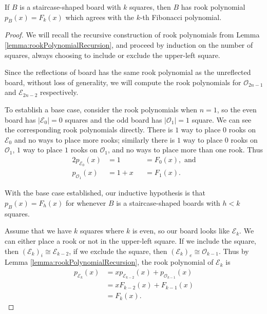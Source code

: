 \begin{lemma}
  If $B$ is a staircase-shaped board with $k$ squares, then
  $B$ has rook polynomial $p_{B}(x) = F_{k}(x)$ which agrees with the $k$-th
  Fibonacci polynomial.
\end{lemma}
\begin{proof}
  We will recall the recursive construction of rook polynomials from
  Lemma \ref{lemma:rookPolynomialRecursion}, and proceed by
  induction on the number of squares, always choosing to include or exclude
  the upper-left square.

  Since the reflections of board has the same rook polynomial as the
  unreflected board, without loss of generality, we
  will compute the rook polynomials for
  $\mathcal{O}_{2n-1}$ and $\mathcal{E}_{2n-2}$ respectively.


  To establish a base case, consider the rook polynomials when $n = 1$, so
  the even board has $|\mathcal{E}_{0}| = 0$ squares and
  the odd board has $|\mathcal{O}_{1}| = 1$ square.
  We can see the corresponding rook polynomials directly. There is $1$ way to
  place $0$ rooks on $\mathcal{E}_{0}$ and no ways to place more rooks;
  similarly there is
  $1$ way to place $0$ rooks on $\mathcal{O}_{1}$,
  $1$ way to place $1$ rooks on $\mathcal{O}_{1}$, and
  no ways to place more than one rook. Thus \begin{alignat}{2}
    p_{\mathcal{E}_{0}}(x) &= 1     &&= F_0(x), \text{ and} \\
    p_{\mathcal{O}_{1}}(x) &= 1 + x &&= F_1(x).
  \end{alignat}

  With the base case established, our inductive hypothesis is that
  $p_{B}(x) = F_{h}(x)$ for
  whenever $B$ is a
  staircase-shaped boards with $h < k$ squares.



  Assume that we have $k$ squares where $k$ is even, so our board looks like
  $\mathcal{E}_{k}$. We can either place a rook or not in the upper-left square.
  If we include the square, then $(\mathcal{E}_{k})_i \cong \mathcal{E}_{k-2}$,
  if we exclude the square, then $(\mathcal{E}_{k})_e \cong \mathcal{O}_{k-1}$.
  Thus by Lemma \ref{lemma:rookPolynomialRecursion}, the rook polynomial of
  $\mathcal{E}_{k}$ is
  \begin{align}
    p_{\mathcal{E}_{k}}(x)
    &= xp_{\mathcal{E}_{k-2}}(x) + p_{\mathcal{O}_{k-1}}(x) \\
    &= xF_{k-2}(x) + F_{k-1}(x) \\
    &= F_{k}(x).
  \end{align}


\end{proof}
